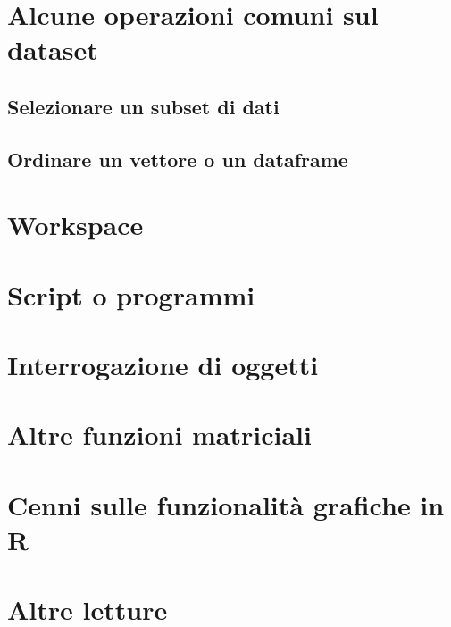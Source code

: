\documentclass[a4paper,12pt,oneside]{book}
\begin{document}
\hypertarget{alcune-operazioni-comuni-sul-dataset}{%
\section*{Alcune operazioni comuni sul dataset}\label{alcune-operazioni-comuni-sul-dataset}}

\hypertarget{selezionare-un-subset-di-dati}{%
\subsection*{Selezionare un subset di dati}\label{selezionare-un-subset-di-dati}}

\hypertarget{ordinare-un-vettore-o-un-dataframe}{%
\subsection*{Ordinare un vettore o un dataframe}\label{ordinare-un-vettore-o-un-dataframe}}

\hypertarget{workspace}{%
\section*{Workspace}\label{workspace}}

\hypertarget{script-o-programmi}{%
\section*{Script o programmi}\label{script-o-programmi}}

\hypertarget{interrogazione-di-oggetti}{%
\section*{Interrogazione di oggetti}\label{interrogazione-di-oggetti}}

\hypertarget{altre-funzioni-matriciali}{%
\section*{Altre funzioni matriciali}\label{altre-funzioni-matriciali}}

\hypertarget{cenni-sulle-funzionalituxe0-grafiche-in-r}{%
\section*{Cenni sulle funzionalità grafiche in R}\label{cenni-sulle-funzionalituxe0-grafiche-in-r}}

\hypertarget{altre-letture-11}{%
\section*{Altre letture}\label{altre-letture-11}}
\end{document}
